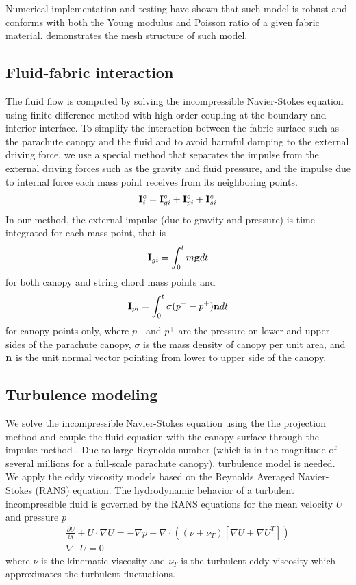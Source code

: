 Numerical implementation and testing have shown that such model is robust and
conforms with both the Young modulus and Poisson ratio of a given fabric
material.  demonstrates the mesh structure of such model.

\subsection{Fluid-fabric interaction} 
The fluid flow is computed by solving the incompressible Navier-Stokes equation
using finite difference method with high order coupling at the boundary and
interior interface. To simplify the interaction between the fabric surface such
as the parachute canopy and the fluid and to avoid harmful damping to the
external driving force, we use a special method that separates the impulse from
the external driving forces such as the gravity and fluid pressure, and the
impulse due to internal force each mass point receives from its neighboring
points.  
\begin{equation} \mathbf{I}^c_i =
\mathbf{I}^c_{gi}+\mathbf{I}^c_{pi}+\mathbf{I}^c_{si} \label{eq:impulse_cnp}
\end{equation} 
In our method, the external impulse (due to gravity and
pressure) is time integrated for each mass point, that is 
\begin{equation}
\mathbf{I}_{gi}=\int_0^tm\mathbf{g}dt 
\end{equation} 
for both canopy and string chord mass points and 
\begin{equation} \mathbf{I}_{pi}=\int_0^t\sigma
(p^--p^+)\mathbf{n}dt 
\end{equation} 
for canopy points only, where $p^-$ and $p^+$ are the pressure on lower and
upper sides of the parachute canopy, $\sigma$ is the mass density of canopy per
unit area, and $\mathbf{n}$ is the unit normal vector pointing from lower to
upper side of the canopy.

\subsection{Turbulence modeling} \label{sec:turbulence}
We solve the incompressible
Navier-Stokes equation using the the projection method
\cite{Chorin68,BroCorMin01} and couple the fluid equation with the canopy
surface through the impulse method \cite{KimLiLi12}. Due to large Reynolds
number (which is in the magnitude of several millions for a full-scale parachute
canopy\cite{Johari2005}), turbulence model is needed.  We apply the eddy viscosity
models based on the Reynolds Averaged Navier-Stokes (RANS) equation.  The
hydrodynamic behavior of a turbulent incompressible fluid is governed by the
RANS equations for the mean velocity $U$ and pressure $p$ \begin{equation}
\begin{aligned} \frac{\partial U}{\partial t}+U\cdot\nabla U = -\nabla p +
\nabla\cdot((\nu+\nu_T)[\nabla U + \nabla U^T])\\ \nabla\cdot U = 0
\end{aligned}\label{eq:NS} \end{equation} where $\nu$ is the kinematic viscosity
and $\nu_T$ is the turbulent eddy viscosity which approximates the turbulent
fluctuations.

